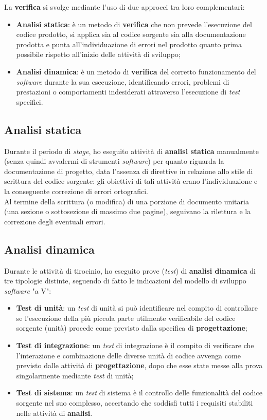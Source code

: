 La \textbf{verifica} si svolge mediante l'uso di due approcci tra loro complementari:
\begin{itemize}
  \item \textbf{Analisi statica}: è un metodo di \textbf{verifica} che non prevede l'esecuzione del codice prodotto, si applica sia al codice sorgente sia alla documentazione prodotta e punta all'individuazione di errori nel prodotto quanto prima possibile rispetto all'inizio delle attività di sviluppo;
  \item \textbf{Analisi dinamica}: è un metodo di \textbf{verifica} del corretto funzionamento del \textit{software} durante la sua esecuzione, identificando errori, problemi di prestazioni o comportamenti indesiderati attraverso l'esecuzione di \textit{test} specifici.
\end{itemize}

\subsection*{Analisi statica}
Durante il periodo di \textit{stage}, ho eseguito attività di \textbf{analisi statica} manualmente (senza quindi avvalermi di strumenti \textit{software}) per quanto riguarda la documentazione di progetto, data l'assenza di direttive in relazione allo stile di scrittura del codice sorgente: 
gli obiettivi di tali attività erano l'individuazione e la conseguente correzione di errori ortografici. \\
Al termine della scrittura (o modifica) di una porzione di documento unitaria (una sezione o sottosezione di massimo due pagine), seguivano la rilettura e la correzione degli eventuali errori.

\subsection*{Analisi dinamica}
Durante le attività di tirocinio, ho eseguito prove (\textit{test}) di \textbf{analisi dinamica} di tre tipologie distinte, seguendo di fatto le indicazioni del modello di sviluppo \textit{software} "a V":
\begin{itemize}
  \item \textbf{Test di unità}: un \textit{test} di unità si può identificare nel compito di controllare se l'esecuzione della più piccola parte utilmente verificabile del codice sorgente (unità) procede come previsto dalla specifica di \textbf{progettazione};
  \item \textbf{Test di integrazione}: un \textit{test} di integrazione è il compito di verificare che l'interazione e combinazione delle diverse unità di codice avvenga come previsto dalle attività di \textbf{progettazione}, dopo che esse state messe alla prova singolarmente mediante \textit{test} di unità;
  \item \textbf{Test di sistema}: un \textit{test} di sistema è il controllo delle funzionalità del codice sorgente nel suo complesso, accertando che soddisfi tutti i requisiti stabiliti nelle attività di \textbf{analisi}.
\end{itemize}

